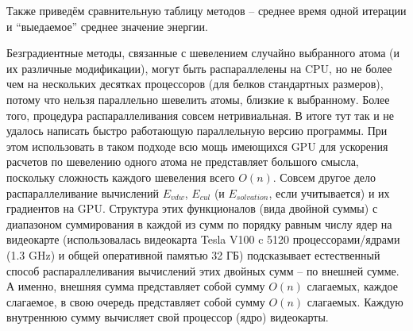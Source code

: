   Также приведём сравнительную таблицу методов -- среднее время одной итерации и ``выедаемое'' среднее значение энергии.
  \fi

  \begin{table}[h]
  	\caption{Сравнение характеристик методов}
  	\label{tabular:timesandtenses}
  	\centering
  \end{table}

  Безградиентные методы, связанные с шевелением случайно выбранного атома (и их различные модификации), могут быть распараллелены на CPU, но не более чем на нескольких десятках процессоров (для белков стандартных размеров), потому что нельзя параллельно шевелить атомы, близкие к выбранному. Более того, процедура распараллеливания совсем нетривиальная. В итоге тут так и не удалось написать быстро работающую параллельную версию программы. При этом использовать в таком подходе всю мощь имеющихся GPU для ускорения расчетов по шевелению одного атома не представляет большого смысла, поскольку сложность каждого шевеления всего ${O}\left( n \right)$. Совсем другое дело распараллеливание вычислений $E_{vdw}$, $E_{cul}$ (и $E_{solvation}$, если учитывается) и их градиентов на GPU. Структура этих функционалов (вида двойной суммы) с диапазоном суммирования в каждой из сумм по порядку равным числу ядер на видеокарте (использовалась видеокарта Tesla V100 c 5120 процессорами/ядрами (1.3 GHz) и общей оперативной памятью 32 ГБ) подсказывает естественный способ распараллеливания вычислений этих двойных сумм -- по внешней сумме. А именно, внешняя сумма представляет собой сумму ${O}\left( n \right)$ слагаемых, каждое слагаемое, в свою очередь представляет собой сумму ${O}\left( n \right)$ слагаемых. Каждую внутреннюю сумму вычисляет свой процессор (ядро) видеокарты. 

